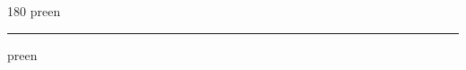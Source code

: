 
\begin{frame}
\begin{center}
\begin{turn}{180}
{\fontsize{2.5cm}{1em}\selectfont preen}
\end{turn}
\vspace{1em}\par  
\hrule
\vspace{1em}\par  
{\fontsize{2.5cm}{1em}\selectfont preen}
\end{center}
\end{frame}
